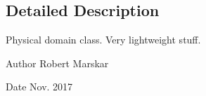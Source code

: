 \subsection{Detailed Description}
Physical domain class. Very lightweight stuff. 

\begin{DoxyAuthor}{Author}
Robert Marskar 
\end{DoxyAuthor}
\begin{DoxyDate}{Date}
Nov. 2017 
\end{DoxyDate}
